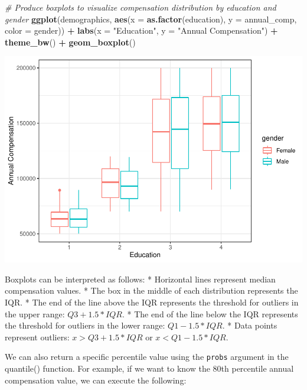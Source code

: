 \documentclass[]{book}
\newenvironment{Shaded}{\begin{snugshade}}{\end{snugshade}}
\newcommand{\CommentTok}[1]{\textcolor[rgb]{0.56,0.35,0.01}{\textit{#1}}}
\newcommand{\DataTypeTok}[1]{\textcolor[rgb]{0.13,0.29,0.53}{#1}}
\newcommand{\KeywordTok}[1]{\textcolor[rgb]{0.13,0.29,0.53}{\textbf{#1}}}
\newcommand{\NormalTok}[1]{#1}
\newcommand{\OperatorTok}[1]{\textcolor[rgb]{0.81,0.36,0.00}{\textbf{#1}}}
\newcommand{\StringTok}[1]{\textcolor[rgb]{0.31,0.60,0.02}{#1}}
\begin{document}
\begin{Shaded}
\begin{Highlighting}[]
\CommentTok{# Produce boxplots to visualize compensation distribution by education and gender}
\KeywordTok{ggplot}\NormalTok{(demographics, }\KeywordTok{aes}\NormalTok{(}\DataTypeTok{x =} \KeywordTok{as.factor}\NormalTok{(education), }\DataTypeTok{y =}\NormalTok{ annual_comp, }\DataTypeTok{color =}\NormalTok{ gender)) }\OperatorTok{+}
\StringTok{  }\KeywordTok{labs}\NormalTok{(}\DataTypeTok{x =} \StringTok{"Education"}\NormalTok{, }\DataTypeTok{y =} \StringTok{"Annual Compensation"}\NormalTok{) }\OperatorTok{+}\StringTok{ }
\StringTok{  }\KeywordTok{theme_bw}\NormalTok{() }\OperatorTok{+}
\StringTok{  }\KeywordTok{geom_boxplot}\NormalTok{()}
\end{Highlighting}
\end{Shaded}

\includegraphics{_main_files/figure-latex/unnamed-chunk-13-1.pdf}

Boxplots can be interpreted as follows:
* Horizontal lines represent median compensation values.
* The box in the middle of each distribution represents the IQR.
* The end of the line above the IQR represents the threshold for outliers in the upper range: \(Q3 + 1.5 * IQR\).
* The end of the line below the IQR represents the threshold for outliers in the lower range: \(Q1 - 1.5 * IQR\).
* Data points represent outliers: \(x > Q3 + 1.5 * IQR\) or \(x < Q1 - 1.5 * IQR\).

We can also return a specific percentile value using the \texttt{probs} argument in the quantile() function. For example, if we want to know the 80th percentile annual compensation value, we can execute the following:
\end{document}
